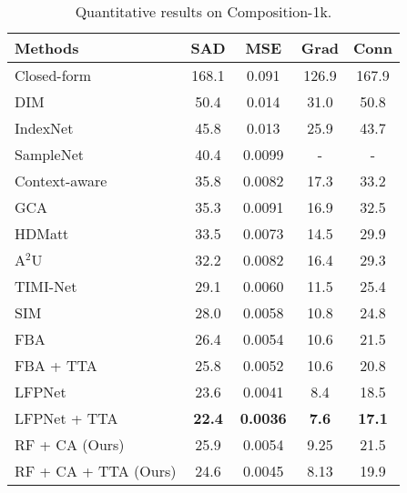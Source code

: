 \documentclass{article}
\theoremstyle{plain}
\begin{document}
\begin{table}[t]
\centering
    \caption{
        Quantitative results on Composition-1k.
}
    \label{table2}
\setlength\tabcolsep{4pt}
\begin{tabular}{|l|cccc|}
    \hline
    Methods & SAD & MSE & Grad & Conn  
  \\
    \hline
    Closed-form \cite{Levin2008AClosed-Form} & 168.1 & 0.091 &126.9 & 167.9
    \\
    DIM \cite{Xu2017DeepImageMatting} & 50.4 & 0.014 & 31.0 & 50.8
    \\
    IndexNet \cite{Lu2019IndicesMatter} & 45.8 & 0.013 & 25.9 & 43.7
    \\
    SampleNet \cite{Tang2019Learning-Based} & 40.4 & 0.0099 & - & -
    \\
    Context-aware \cite{Houjj2019ContextAwareImageMatting} & 35.8 & 0.0082 & 17.3 & 33.2
    \\
    GCA \cite{Li2020NaturalImageMatting} 
    & 35.3 & 0.0091 & 16.9 & 32.5
    \\
    HDMatt \cite{Yu2021High-ResolutionDeepImageMatting}
    & 33.5 & 0.0073 & 14.5 & 29.9
    \\
    A$^2$U \cite{Dai2021LearningAffinityAware}
    & 32.2 & 0.0082 & 16.4 & 29.3
    \\
    TIMI-Net \cite{Liu2021TripartiteInformationMining} & 29.1 & 0.0060 & 11.5 & 25.4
    \\
    SIM \cite{Sun2021SemanticImageMatting} & 28.0 & 0.0058 & 10.8 & 24.8
    \\
    FBA \cite{Forte2020FBA} & 26.4 & 0.0054 & 10.6 & 21.5
    \\
    FBA + TTA \cite{Forte2020FBA} &  25.8 & 0.0052 & 10.6 & 20.8
    \\
    LFPNet \cite{Liu2021Long-RangeFeaturePropagating} 
                                  & 23.6 & 0.0041 & 8.4 & 18.5
                                  \\
    LFPNet + TTA \cite{Liu2021Long-RangeFeaturePropagating} 
                                  & \textbf{22.4} & \textbf{0.0036} & \textbf{7.6} & \textbf{17.1}
    \\
    \hline
    RF + CA (Ours) &
            25.9 & 0.0054 & 9.25 & 21.5
            \\
    RF + CA + TTA (Ours) &
            24.6 & 0.0045 & 8.13 & 19.9
\\
    \hline
\end{tabular}
\end{table}
\end{document}
